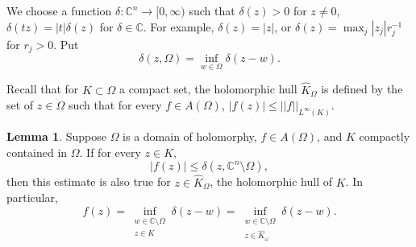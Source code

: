 \documentclass[12pt]{report}
\newcommand{\CC}{\mathbb{C}}
\theoremstyle{definition}
\newtheorem{lemma}[theorem]{Lemma}
\begin{document}
We choose a function $\delta: \CC^n \to [0, \infty)$ such that $\delta(z) > 0$ for $z \neq 0$, $\delta(tz) = |t|\delta(z)$ for $\delta \in \CC$. For example, $\delta(z) = |z|$, or $\delta(z) = \max_j |z_j|r_j^{-1}$ for $r_j > 0$. Put
$$\delta(z, \Omega) = \inf_{w \in \Omega} \delta(z - w).$$

Recall that for $K \subset \Omega$ a compact set, the holomorphic hull $\hat K_\Omega$ is defined by the set of $z \in \Omega$ such that for every $f \in A(\Omega)$, $|f(z)| \leq ||f||_{L^\infty(K)}$.

\begin{lemma}
    Suppose $\Omega$ is a domain of holomorphy, $f \in A(\Omega)$, and $K$ compactly contained in $\Omega$. If for every $z \in K$,
    $$|f(z)| \leq \delta(z, \CC^n \setminus \Omega),$$
    then this estimate is also true for $z \in \hat K_\Omega$, the holomorphic hull of $K$. In particular, 
    $$f(z) = \inf_{\substack{w \in \CC \setminus \Omega\\z \in K}} \delta(z - w) = \inf_{\substack{w \in \CC \setminus \Omega\\z \in \hat K_\omega}}
 \delta(z - w).$$\end{lemma}
\end{document}
